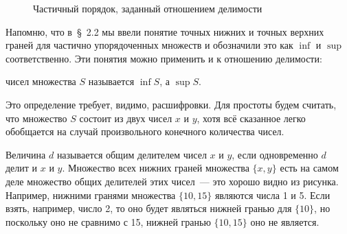 \begin{figure}[h]
\centering
{}
\caption{Частичный порядок, заданный отношением делимости}
\end{figure}

Напомню, что в~\S~2.2 мы ввели понятие точных нижних и точных верхних граней для частично упорядоченных множеств и обозначили это как $\inf$ и $\sup$ соответственно. Эти понятия можно применить и к отношению делимости:

\begin{definition}
 чисел множества $S$ называется $\inf S$, а  $\sup S$.
\end{definition}

Это определение требует, видимо, расшифровки. Для простоты будем считать, что множество $S$ состоит из двух чисел $x$ и $y$, хотя всё сказанное легко обобщается на случай произвольного конечного количества чисел.

Величина $d$ называется общим делителем чисел $x$ и $y$, если одновременно $d$ делит и $x$ и $y$. Множество всех нижних граней множества $\{x, y\}$ есть на самом деле множество общих делителей этих чисел~--- это хорошо видно из рисунка. Например, нижними гранями множества $\{10, 15\}$ являются числа 1 и 5. Если взять, например, число 2, то оно будет являться нижней гранью для $\{10\}$, но поскольку оно не сравнимо с 15, нижней гранью $\{10, 15\}$ оно не является.

